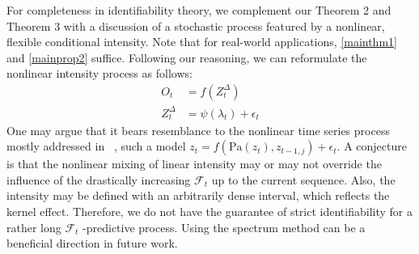 \documentclass[10pt]{article}
\numberwithin{figure}{section}
\begin{document}
For completeness in identifiability theory, we complement our Theorem 2 and Theorem 3 with a discussion of a stochastic process featured by a nonlinear, flexible conditional intensity. Note that for real-world applications, \autoref{mainthm1} and \autoref{mainprop2} suffice.  Following our reasoning, we can reformulate the nonlinear intensity process as follows:
\begin{align}
    O_t &= f(Z^{\Delta}_t)\\
    Z_t^{\Delta} &= \psi(\lambda_t ) + \epsilon_t
\end{align}
One may argue that it bears resemblance to the nonlinear time series process mostly addressed in~\cite{song_temporally_2023,yao_learning_2022,yao_temporally_2022} , such a model $z_t = f(\mathrm{Pa}(z_t),z_{t-1,j})+\epsilon_t$.  A conjecture is that the nonlinear mixing of linear intensity may or may not override the influence of the drastically increasing $\mathcal{F}_t$ up to the current sequence. Also, the intensity may be defined with an arbitrarily dense interval, which reflects the kernel effect. Therefore, we do not have the guarantee of strict identifiability for a rather long $\mathcal{F}_t$ -predictive process.  Using the spectrum method can be a beneficial direction in future work. 
\end{document}
